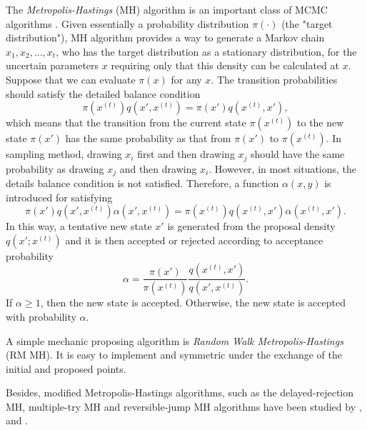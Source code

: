 The \textit{Metropolis-Hastings} (MH) algorithm is an important class of MCMC algorithms \cite{smith1993bayesian} \cite{tierney1994markov} \cite{gilks1995markov}. Given essentially a probability distribution $\pi(\cdot)$ (the "target distribution"), MH algorithm provides a way to generate a Markov chain $x_1, x_2,\ldots, x_t$, who has the target distribution as a stationary distribution, for the uncertain parameters $x$ requiring only that this density can be calculated at $x$. Suppose that we can evaluate $\pi(x)$ for any $x$. The transition probabilities should satisfy the detailed balance condition
\begin{equation*}
\pi\left(x^{(t)}\right)q\left(x', x^{(t)}\right) = \pi\left(x'\right)q\left(x^{(t)}, x'\right),
\end{equation*}
which means that the transition from the current state $\pi\left(x^{\left(t\right)}\right)$ to the new state $\pi\left(x'\right)$ has the same probability as that 
from $\pi\left(x'\right)$ to $\pi\left(x^{\left(t\right)}\right)$. In sampling method, drawing $x_i$ first and then drawing $x_j$ should have the same probability as drawing $x_j$ and then drawing $x_i$. However, in most situations, the details balance condition is not satisfied. Therefore, a function $\alpha\left(x,y\right)$ is introduced for satisfying 
\begin{equation*}
\pi\left(x'\right)q\left(x', x^{\left(t\right)}\right)\alpha\left(x',x^{\left(t\right)}\right) = \pi\left(x^{\left(t\right)}\right)q\left(x^{\left(t\right)}, x'\right)\alpha\left(x^{\left(t\right)},x'\right).
\end{equation*}
In this way, a tentative new state $x'$ is generated from the proposal density $q\left(x';x^{\left(t\right)}\right)$ and it is then accepted or rejected according to acceptance probability 
\begin{equation}\label{IntroAccp}
\alpha=\frac{\pi\left(x'\right)}{\pi\left(x^{\left(t\right)}\right)}\frac{q\left(x^{\left(t\right)}, x'\right)}{q\left(x', x^{\left(t\right)}\right)}.
\end{equation}
If $\alpha \geq 1$, then the new state is accepted. Otherwise, the new state is accepted with probability $\alpha$.

A simple mechanic proposing algorithm is \textit{Random Walk Metropolis-Hastings} (RM MH). It is easy to implement and symmetric under the exchange of the initial and proposed points. 

Besides, modified Metropolis-Hastings algorithms, such as the delayed-rejection MH, multiple-try MH and reversible-jump MH algorithms have been studied by \cite{tierney1999some}, \cite{liu2000multiple} and \cite{green1995reversible}. 
 

